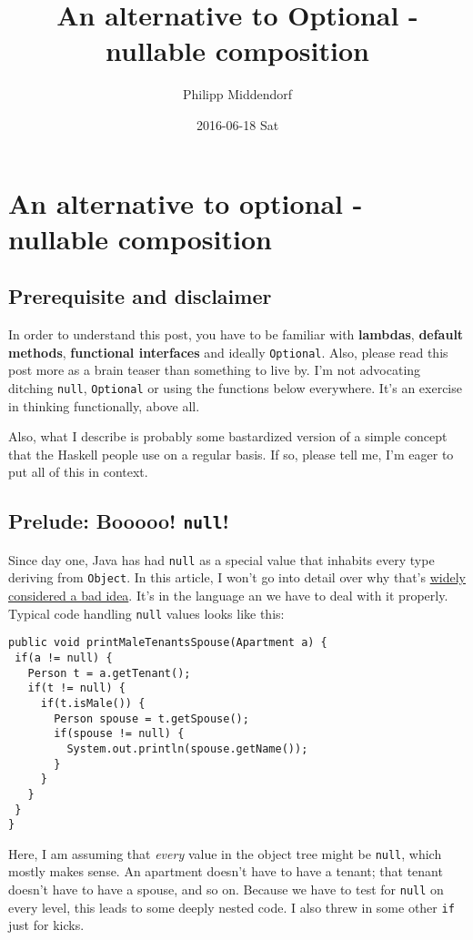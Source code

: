 \documentclass[11pt]{article}
\author{Philipp Middendorf}
\date{2016-06-18 Sat}
\title{An alternative to Optional - nullable composition}
\begin{document}
\maketitle
\section*{An alternative to optional - nullable composition}
\label{sec:orgheadline6}
\subsection*{Prerequisite and disclaimer}
\label{sec:orgheadline1}
In order to understand this post, you have to be familiar with \textbf{lambdas}, \textbf{default methods}, \textbf{functional interfaces} and ideally \texttt{Optional}. Also, please read this post more as a brain teaser than something to live by. I'm not advocating ditching \texttt{null}, \texttt{Optional} or using the functions below everywhere. It's an exercise in thinking functionally, above all.

Also, what I describe is probably some bastardized version of a simple concept that the Haskell people use on a regular basis. If so, please tell me, I'm eager to put all of this in context.
\subsection*{Prelude: Booooo! \texttt{null}!}
\label{sec:orgheadline2}
Since day one, Java has had \texttt{null} as a special value that inhabits every type deriving from \texttt{Object}. In this article, I won't go into detail over why that's \href{https://www.infoq.com/presentations/Null-References-The-Billion-Dollar-Mistake-Tony-Hoare}{widely considered a bad idea}. It's in the language an we have to deal with it properly. Typical code handling \texttt{null} values looks like this:

\begin{verbatim}
public void printMaleTenantsSpouse(Apartment a) {
 if(a != null) {
   Person t = a.getTenant();
   if(t != null) {
     if(t.isMale()) {
       Person spouse = t.getSpouse();
       if(spouse != null) {
         System.out.println(spouse.getName());
       }
     }
   }
 }
}
\end{verbatim}

Here, I am assuming that \emph{every} value in the object tree might be \texttt{null}, which mostly makes sense. An apartment doesn't have to have a tenant; that tenant doesn't have to have a spouse, and so on. Because we have to test for \texttt{null} on every level, this leads to some deeply nested code. I also threw in some other \texttt{if} just for kicks.
\end{document}

